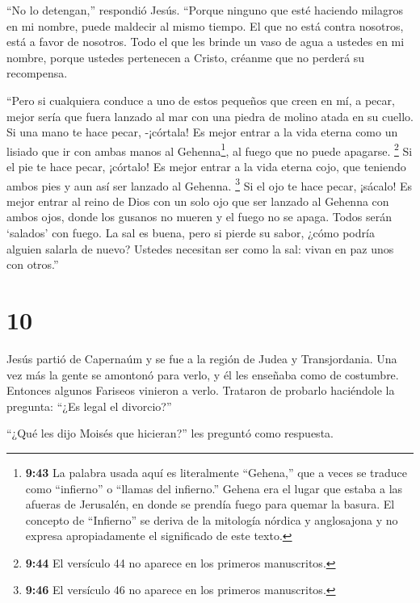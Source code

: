  ``No lo detengan,'' respondió Jesús. ``Porque ninguno que
esté haciendo milagros en mi nombre, puede maldecir al mismo tiempo.
 El que no está contra nosotros, está a favor de nosotros.
 Todo el que les brinde un vaso de agua a ustedes en mi
nombre, porque ustedes pertenecen a Cristo, créanme que no perderá su
recompensa.

 ``Pero si cualquiera conduce a uno de estos pequeños que
creen en mí, a pecar, mejor sería que fuera lanzado al mar con una
piedra de molino atada en su cuello.  Si una mano te hace
pecar, -¡córtala! Es mejor entrar a la vida eterna como un lisiado que
ir con ambas manos al Gehenna\footnote{\textbf{9:43} La palabra usada
  aquí es literalmente ``Gehena,'' que a veces se traduce como
  ``infierno'' o ``llamas del infierno.'' Gehena era el lugar que estaba
  a las afueras de Jerusalén, en donde se prendía fuego para quemar la
  basura. El concepto de ``Infierno'' se deriva de la mitología nórdica
  y anglosajona y no expresa apropiadamente el significado de este
  texto.}, al fuego que no puede apagarse.  \footnote{\textbf{9:44}
  El versículo 44 no aparece en los primeros manuscritos.} 
Si el pie te hace pecar, ¡córtalo! Es mejor entrar a la vida eterna
cojo, que teniendo ambos pies y aun así ser lanzado al Gehenna.
 \footnote{\textbf{9:46} El versículo 46 no aparece en los
  primeros manuscritos.}  Si el ojo te hace pecar, ¡sácalo!
Es mejor entrar al reino de Dios con un solo ojo que ser lanzado al
Gehenna con ambos ojos,  donde los gusanos no mueren y el
fuego no se apaga.  Todos serán `salados' con fuego.
 La sal es buena, pero si pierde su sabor, ¿cómo podría
alguien salarla de nuevo? Ustedes necesitan ser como la sal: vivan en
paz unos con otros.''

\hypertarget{section-9}{%
\section{10}\label{section-9}}

 Jesús partió de Capernaúm y se fue a la región de Judea y
Transjordania. Una vez más la gente se amontonó para verlo, y él les
enseñaba como de costumbre.  Entonces algunos Fariseos
vinieron a verlo. Trataron de probarlo haciéndole la pregunta: ``¿Es
legal el divorcio?''

 ``¿Qué les dijo Moisés que hicieran?'' les preguntó como
respuesta.

